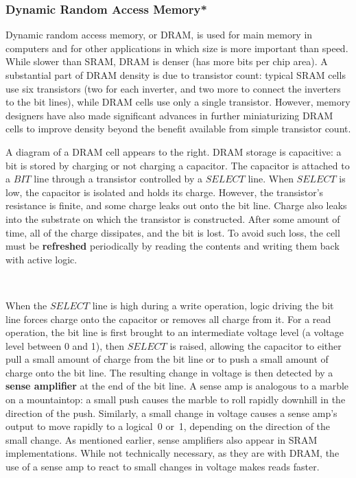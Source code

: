 \subsubsection{Dynamic Random Access Memory*}

Dynamic random access memory, or DRAM, is used for main memory in
computers and for other applications in which size is more important
than speed.  While slower than SRAM, DRAM is denser (has
more bits per chip area).  A substantial part of DRAM density is
due to transistor count: typical SRAM cells use six transistors
(two for each inverter, and two more to connect the inverters to the 
bit lines), while DRAM cells use only a single transistor.
However, memory designers have also made significant advances in
further miniaturizing DRAM cells to improve density beyond the 
benefit available from simple transistor count.

\begin{minipage}{5.15in}
A diagram of a DRAM cell appears to the right.  
DRAM storage is capacitive: a bit is stored by charging or not charging 
a capacitor.  The capacitor is attached to a $BIT$ line 
through a transistor controlled by a $SELECT$ line.  
%
When $SELECT$ is low, the capacitor is isolated and 
holds its charge.  However, the transistor's resistance is
finite, and some charge leaks out onto the bit line.  Charge also
leaks into the substrate on which the transistor is constructed.  After
some amount of time, all of the charge dissipates, and the bit is
lost.  To avoid such loss, the cell must be {\bf refreshed}
periodically by reading the contents and writing them back with active
logic.
\end{minipage}\hspace{0.25in}%
\begin{minipage}{1.1in}
\\
\end{minipage}

When the $SELECT$ line is high during a write operation, logic driving
the bit line forces charge onto the capacitor or removes all charge
from it.  For a read operation, the bit line is first brought to an
intermediate voltage level (a voltage level between 0 and 1), then
$SELECT$ is raised, allowing the capacitor to either pull a small
amount of charge from the bit line or to push a small amount of charge
onto the bit line.  The resulting change in voltage is then detected
by a {\bf sense amplifier} at the end of the bit line.  A sense amp 
is analogous to a marble on a mountaintop: a small push causes the
marble to roll rapidly downhill in the direction of the push.
Similarly, a small change in voltage causes a sense amp's output to
move rapidly to a logical~0 or~1, depending on the direction of the
small change.  As mentioned earlier, sense amplifiers also appear in 
SRAM implementations.
While not technically necessary, as they are with DRAM, the use of a
sense amp to react to small changes in voltage makes reads faster.

